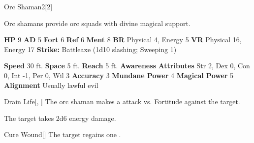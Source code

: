   \begin{monsubsection}{Orc Shaman}{2}[2]
    \vspace{-1em}\vspace{-1em}
    \vspace{0em}

    
          Orc shamans provide orc squads with divine magical support.
        

    \begin{spellcontent}
      \begin{spelltargetinginfo}
        \pari \textbf{HP} 9 \monsep
          \textbf{AD} 5 \monsep
          \textbf{Fort} 6 \monsep
          \textbf{Ref} 6 \monsep
          \textbf{Ment} 8
        \pari \textbf{BR} Physical 4, Energy 5 \monsep
        \textbf{VR} Physical 16, Energy 17
        \pari \textbf{Strike:}
            Battleaxe  (1d10 slashing; Sweeping 1)
      \end{spelltargetinginfo}
    \end{spellcontent}
    \begin{monsterfooter}
      \pari \textbf{Speed} 30 ft. \monsep
        \textbf{Space} 5 ft. \monsep
        \textbf{Reach} 5 ft.
      \pari \textbf{Awareness} 
      \pari \textbf{Attributes}
        Str 2, Dex 0,
        Con 0, Int -1,
        Per 0, Wil 3
      \pari \textbf{Accuracy} 3 \monsep
        \textbf{Mundane Power} 4 \monsep
      \textbf{Magical Power} 5
      \pari \textbf{Alignment} Usually lawful evil
    \end{monsterfooter}
  \end{monsubsection}
  \begin{freeability}{Drain Life}[, ]
       The orc shaman makes a  attack
        vs. Fortitude against the target.
    
    \hit The target takes 2d6 energy damage.
    \end{freeability}
  
      
    \begin{freeability}{Cure Wound}[]
      The target regains one .
    \end{freeability}
  
